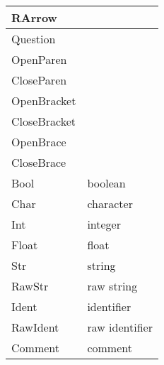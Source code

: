 \begin{longtable}{|p{4cm}| l |}
\hline
RArrow & \kw{->} \\
\hline
Question & \kw{?} \\
\hline
OpenParen & \kw{(} \\
\hline
CloseParen & \kw{)} \\
\hline
OpenBracket & \kw{[} \\
\hline
CloseBracket & \kw{]} \\
\hline
OpenBrace & \kw{\{} \\
\hline
CloseBrace & \kw{\}} \\
\hline
Bool & boolean \\
\hline
Char & character \\
\hline
Int & integer \\
\hline
Float & float \\
\hline
Str & string \\
\hline
RawStr & raw string \\
\hline
Ident & identifier \\
\hline
RawIdent & raw identifier \\
\hline
Comment & comment \\
\hline
\end{longtable}
